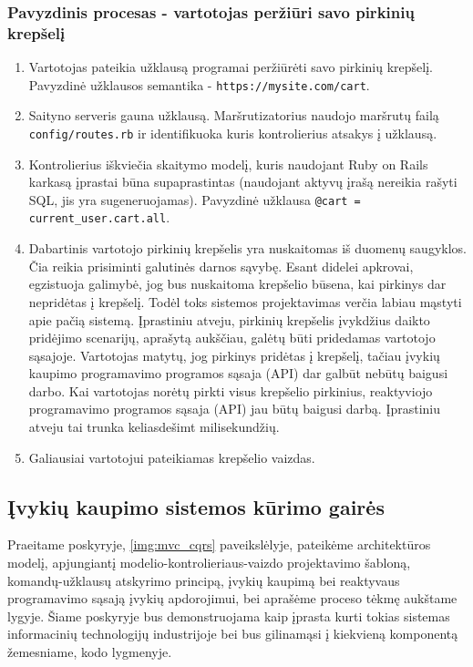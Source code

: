 \subsubsection{Pavyzdinis procesas - vartotojas peržiūri savo pirkinių krepšelį}

\begin{enumerate}
  \item Vartotojas pateikia užklausą programai peržiūrėti savo pirkinių krepšelį. Pavyzdinė užklausos semantika - \lstinline|https://mysite.com/cart|.

  \item Saityno serveris gauna užklausą. Maršrutizatorius naudojo maršrutų failą \lstinline|config/routes.rb| ir identifikuoka kuris kontrolierius atsakys į užklausą.

  \item Kontrolierius iškviečia skaitymo modelį, kuris naudojant Ruby on Rails karkasą įprastai būna supaprastintas (naudojant aktyvų įrašą nereikia rašyti SQL, jis yra sugeneruojamas). Pavyzdinė užklausa \lstinline|@cart = current_user.cart.all|.

  \item Dabartinis vartotojo pirkinių krepšelis yra nuskaitomas iš duomenų saugyklos. Čia reikia prisiminti galutinės darnos sąvybę. Esant didelei apkrovai, egzistuoja galimybė, jog bus nuskaitoma krepšelio būsena, kai pirkinys dar nepridėtas į krepšelį. Todėl toks sistemos projektavimas verčia labiau mąstyti apie pačią sistemą. Įprastiniu atveju, pirkinių krepšelis įvykdžius daikto pridėjimo scenarijų, aprašytą aukščiau, galėtų būti pridedamas vartotojo sąsajoje. Vartotojas matytų, jog pirkinys pridėtas į krepšelį, tačiau įvykių kaupimo programavimo programos sąsaja (API) dar galbūt nebūtų baigusi darbo. Kai vartotojas norėtų pirkti visus krepšelio pirkinius, reaktyviojo programavimo programos sąsaja (API) jau būtų baigusi darbą. Įprastiniu atveju tai trunka keliasdešimt milisekundžių.

  \item Galiausiai vartotojui pateikiamas krepšelio vaizdas.
\end{enumerate}

\subsection{Įvykių kaupimo sistemos kūrimo gairės}

Praeitame poskyryje, \ref{img:mvc_cqrs} paveikslėlyje, pateikėme architektūros modelį, apjungiantį modelio-kontrolieriaus-vaizdo projektavimo šabloną, komandų-užklausų atskyrimo principą, įvykių kaupimą bei reaktyvaus programavimo sąsają įvykių apdorojimui, bei aprašėme proceso tėkmę aukštame lygyje. Šiame poskyryje bus demonstruojama kaip įprasta kurti tokias sistemas informacinių technologijų industrijoje bei bus gilinamąsi į kiekvieną komponentą žemesniame, kodo lygmenyje.

